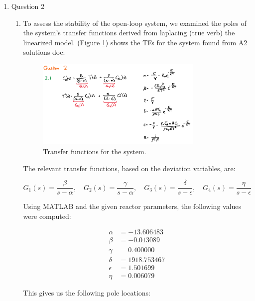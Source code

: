 \documentclass[12pt]{article}
\begin{document}
\begin{enumerate}
\begin{enumerate}
  \end{enumerate}

\pagebreak

\item Question 2
  \begin{enumerate}
    \item To assess the stability of the open-loop system, we examined the poles of the system's transfer functions derived from laplacing (true verb) the linearized model. (Figure \ref{fig:figure2_1}) shows the TFs for the system found from A2 solutions doc:
        
    \begin{figure}[H]
      \centering
      \includegraphics[width=0.8\textwidth]{Figures/figure2_1.png}
      \caption{Transfer functions for the system.}
      \label{fig:figure2_1}
    \end{figure}

    The relevant transfer functions, based on the deviation variables, are:

    \[
    G_1(s) = \frac{\beta}{s - \alpha}, \quad
    G_2(s) = \frac{\gamma}{s - \alpha}, \quad
    G_3(s) = \frac{\delta}{s - \epsilon}, \quad
    G_4(s) = \frac{\eta}{s - \epsilon}
    \]
    
    Using MATLAB and the given reactor parameters, the following values were computed:
    
    \begin{align*}
    \alpha &= -13.606483 \\
    \beta  &= -0.013089 \\
    \gamma &= 0.400000 \\
    \delta &= 1918.753467 \\
    \epsilon &= 1.501699 \\
    \eta &= 0.006079
    \end{align*}
    
    This gives us the following pole locations:
    

\end{enumerate}
\end{enumerate}
\end{document}
